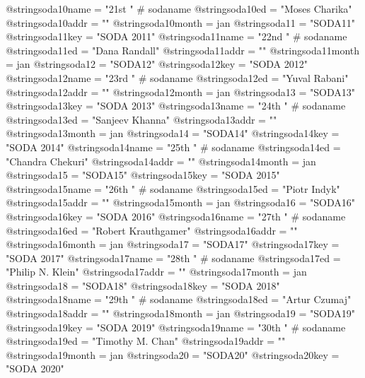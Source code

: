 @string{soda10name =            "21st " # sodaname}
@string{soda10ed =              "Moses Charika"}
@string{soda10addr =            ""}
@string{soda10month =           jan}
@string{soda11 =                "SODA11"}
@string{soda11key =             "SODA 2011"}
@string{soda11name =            "22nd " # sodaname}
@string{soda11ed =              "Dana Randall"}
@string{soda11addr =            ""}
@string{soda11month =           jan}
@string{soda12 =                "SODA12"}
@string{soda12key =             "SODA 2012"}
@string{soda12name =            "23rd " # sodaname}
@string{soda12ed =              "Yuval Rabani"}
@string{soda12addr =            ""}
@string{soda12month =           jan}
@string{soda13 =                "SODA13"}
@string{soda13key =             "SODA 2013"}
@string{soda13name =            "24th " # sodaname}
@string{soda13ed =              "Sanjeev Khanna"}
@string{soda13addr =            ""}
@string{soda13month =           jan}
@string{soda14 =                "SODA14"}
@string{soda14key =             "SODA 2014"}
@string{soda14name =            "25th " # sodaname}
@string{soda14ed =              "Chandra Chekuri"}
@string{soda14addr =            ""}
@string{soda14month =           jan}
@string{soda15 =                "SODA15"}
@string{soda15key =             "SODA 2015"}
@string{soda15name =            "26th " # sodaname}
@string{soda15ed =              "Piotr Indyk"}
@string{soda15addr =            ""}
@string{soda15month =           jan}
@string{soda16 =                "SODA16"}
@string{soda16key =             "SODA 2016"}
@string{soda16name =            "27th " # sodaname}
@string{soda16ed =              "Robert Krauthgamer"}
@string{soda16addr =            ""}
@string{soda16month =           jan}
@string{soda17 =                "SODA17"}
@string{soda17key =             "SODA 2017"}
@string{soda17name =            "28th " # sodaname}
@string{soda17ed =              "Philip N. Klein"}
@string{soda17addr =            ""}
@string{soda17month =           jan}
@string{soda18 =                "SODA18"}
@string{soda18key =             "SODA 2018"}
@string{soda18name =            "29th " # sodaname}
@string{soda18ed =              "Artur Czumaj"}
@string{soda18addr =            ""}
@string{soda18month =           jan}
@string{soda19 =                "SODA19"}
@string{soda19key =             "SODA 2019"}
@string{soda19name =            "30th " # sodaname}
@string{soda19ed =              "Timothy M. Chan"}
@string{soda19addr =            ""}
@string{soda19month =           jan}
@string{soda20 =                "SODA20"}
@string{soda20key =             "SODA 2020"}
